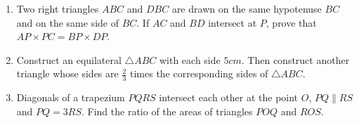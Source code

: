 \begin{enumerate}
\item Two right triangles $ABC$ and $DBC$ are drawn on the same hypotenuse $BC$ and on the same side of $BC$. If $AC$ and $BD$ intersect at $P$, prove that $AP \times PC = BP \times DP$.

\item Construct an equilateral $\triangle ABC$ with each side $5 cm$. Then construct another triangle whose sides are $\frac{2}{3}$ times the corresponding sides of $\triangle ABC$.

\item Diagonals of a trapezium $PQRS$ intersect each other at the point $O$,
$PQ \parallel RS$ and $PQ = 3RS$. Find the ratio of the areas of triangles $POQ$ and $ROS$.
\end{enumerate}
